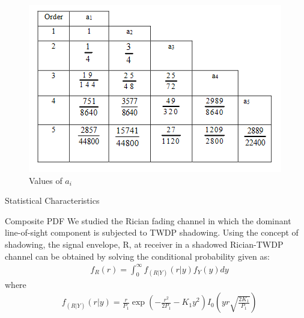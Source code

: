 \documentclass{beamer}
\begin{document}
\begin{frame}{}
   \begin{figure}
       \centering
       \includegraphics{Figures/Values of a_i.PNG}
       \caption{Values of \(a_i\)}
       \label{fig:my_label}
   \end{figure}
\end{frame}
\begin{frame}{Statistical Characteristics}
\begin{block}{Composite PDF}
We  studied  the  Rician  fading  channel  in  which  the  dominant  line-of-sight  component  is  subjected  to  TWDP shadowing. Using the concept of shadowing, the signal envelope, R, at receiver in a shadowed Rician-TWDP channel can be obtained by solving the conditional probability given as:
\begin{align}
    &f_R(r)=\int_0^\infty f_{(R|Y)} (r|y) f_Y(y) dy \label{composite}
\end{align}    
where 
\begin{align} 
    &f_{(R|Y)} (r|y) = \frac{r}{P_1} \exp\left(-\frac{r^2}{2 P_1} - K_1 y^2\right)
    I_0 \left( yr\sqrt{\frac{2K_1}{P_1}}\right) \label{rician-cond}
\end{align}
\end{block}
\end{frame}
\end{document}
